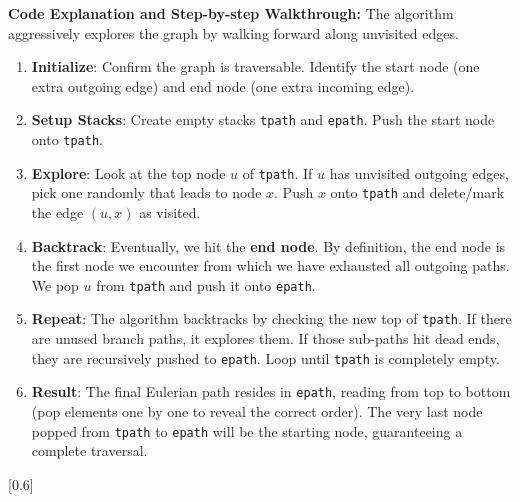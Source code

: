 \textbf{Code Explanation and Step-by-step Walkthrough:} The algorithm aggressively explores the graph by walking forward along unvisited edges.
\begin{enumerate}
    \item \textbf{Initialize}: Confirm the graph is traversable. Identify the start node (one extra outgoing edge) and end node (one extra incoming edge).
    \item \textbf{Setup Stacks}: Create empty stacks \texttt{tpath} and \texttt{epath}. Push the start node onto \texttt{tpath}.
    \item \textbf{Explore}: Look at the top node $u$ of \texttt{tpath}. If $u$ has unvisited outgoing edges, pick one randomly that leads to node $x$. Push $x$ onto \texttt{tpath} and delete/mark the edge $(u,x)$ as visited.
    \item \textbf{Backtrack}: Eventually, we hit the \textbf{end node}. By definition, the end node is the first node we encounter from which we have exhausted all outgoing paths. We pop $u$ from \texttt{tpath} and push it onto \texttt{epath}.
    \item \textbf{Repeat}: The algorithm backtracks by checking the new top of \texttt{tpath}. If there are unused branch paths, it explores them. If those sub-paths hit dead ends, they are recursively pushed to \texttt{epath}. Loop until \texttt{tpath} is completely empty.
    \item \textbf{Result}: The final Eulerian path resides in \texttt{epath}, reading from top to bottom (pop elements one by one to reveal the correct order). The very last node popped from \texttt{tpath} to \texttt{epath} will be the starting node, guaranteeing a complete traversal.
\end{enumerate}


[0.6]


